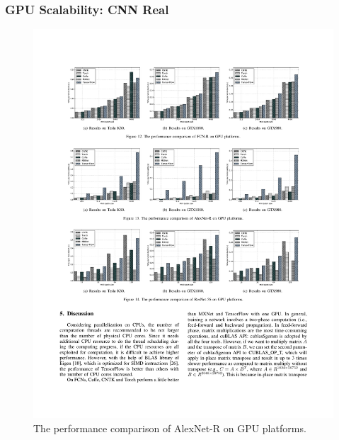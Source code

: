 \begin{frame}
	\MyLogo
	\frametitle{GPU Scalability: CNN Real}

	\begin{figure}[htbp] 
		\includegraphics[width=\linewidth]{figures/AlexNet-R2.pdf} 
		\caption{The performance comparison of AlexNet-R on GPU platforms.}
	\end{figure}

\end{frame}


